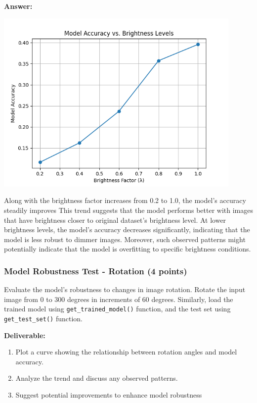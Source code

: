\documentclass[11pt, oneside]{article}   	%
\begin{document}
\textbf{Answer:} 
\begin{center}
    \includegraphics[width=0.9\textwidth]{report_pic/Brightness_accuracy.png}
\end{center}
Along with the brightness factor increases from 0.2 to 1.0, the model's accuracy steadily improves
This trend suggests that the model performs better with images that have brightness closer to original dataset's brightness level.
At lower brightness levels, the model's accuracy decreases significantly, indicating that the model is less robust to dimmer images.
Moreover, such observed patterns might potentially indicate that the model is overfitting to specific brightness conditions.

\subsubsection*{Model Robustness Test - Rotation (4 points)}

Evaluate the model's robustness to changes in image rotation. Rotate the input image from $0$ to $300$ degrees in increments of $60$ degrees. 
Similarly, load the trained model using \texttt{get\_trained\_model()} function, and the test set using \texttt{get\_test\_set()} function. 

\noindent\textbf{Deliverable:}

\begin{enumerate}
    \item Plot a curve showing the relationship between rotation angles and model accuracy.
    \item Analyze the trend and discuss any observed patterns.
    \item Suggest potential improvements to enhance model robustness
\end{enumerate}
\end{document}
